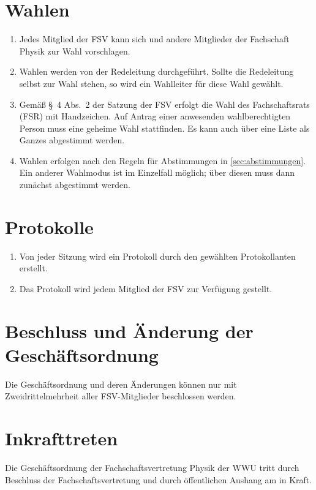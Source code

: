 \documentclass[
	a4paper,
	12pt,
	oneside,
	parskip=half-,
	pagesize,
	headsepline,
	german,
	ngerman
]{scrartcl}
\begin{document}
\section{Wahlen}
\begin{enumerate}
	\item Jedes Mitglied der FSV kann sich und andere Mitglieder der Fachschaft Physik zur Wahl vorschlagen.
	\item Wahlen werden von der Redeleitung durchgeführt. Sollte die Redeleitung selbst zur Wahl stehen, so wird ein Wahlleiter für diese Wahl gewählt.
	\item Gemäß §~4 Abs.~2 der Satzung der FSV erfolgt die Wahl des Fachschaftsrats (FSR) mit Handzeichen. Auf Antrag einer anwesenden wahlberechtigten Person muss eine geheime Wahl stattfinden. Es kann auch über eine Liste als Ganzes abgestimmt werden.
	\item Wahlen erfolgen nach den Regeln für Abstimmungen in \ref{sec:abstimmungen}. Ein anderer Wahlmodus ist im Einzelfall möglich; über diesen muss dann zunächst abgestimmt werden.
\end{enumerate}

\section{Protokolle}
\begin{enumerate}
	\item Von jeder Sitzung wird ein Protokoll durch den gewählten Protokollanten erstellt.
	\item Das Protokoll wird jedem Mitglied der FSV zur Verfügung gestellt.
\end{enumerate}

\section{Beschluss und Änderung der Geschäftsordnung}
Die Geschäftsordnung und deren Änderungen können nur mit Zweidrittelmehrheit aller FSV-Mitglieder beschlossen werden.

\section{Inkrafttreten}
Die Geschäftsordnung der Fachschaftsvertretung Physik der WWU tritt durch Beschluss der Fachschaftsvertretung und durch öffentlichen Aushang am  in Kraft.
\end{document}
